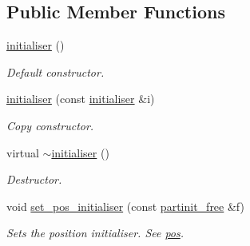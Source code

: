 \subsection*{Public Member Functions}
\begin{DoxyCompactItemize}
\item 
\mbox{\label{classphysim_1_1init_1_1initialiser_a6789bf24454c374ac607851d5888f96d}} 
\hyperlink{classphysim_1_1init_1_1initialiser_a6789bf24454c374ac607851d5888f96d}{initialiser} ()
\begin{DoxyCompactList}\small\item\em Default constructor. \end{DoxyCompactList}\item 
\mbox{\label{classphysim_1_1init_1_1initialiser_a9f34121f9325d86f1a3d80cf67646cf5}} 
\hyperlink{classphysim_1_1init_1_1initialiser_a9f34121f9325d86f1a3d80cf67646cf5}{initialiser} (const \hyperlink{classphysim_1_1init_1_1initialiser}{initialiser} \&i)
\begin{DoxyCompactList}\small\item\em Copy constructor. \end{DoxyCompactList}\item 
\mbox{\label{classphysim_1_1init_1_1initialiser_adbb5280ef62917b03bb0f4f2baf69019}} 
virtual \hyperlink{classphysim_1_1init_1_1initialiser_adbb5280ef62917b03bb0f4f2baf69019}{$\sim$initialiser} ()
\begin{DoxyCompactList}\small\item\em Destructor. \end{DoxyCompactList}\item 
\mbox{\label{classphysim_1_1init_1_1initialiser_ae2e6b7f36663b74b13746d671353e277}} 
void \hyperlink{classphysim_1_1init_1_1initialiser_ae2e6b7f36663b74b13746d671353e277}{set\+\_\+pos\+\_\+initialiser} (const \hyperlink{namespacephysim_1_1init_a075c918c300c8a7eb1e3449f8848be22}{partinit\+\_\+free} \&f)
\begin{DoxyCompactList}\small\item\em Sets the position initialiser. See \hyperlink{classphysim_1_1init_1_1initialiser_a1980105ffaa655858b90a8f3a9368682}{pos}. \end{DoxyCompactList}\item 

\end{DoxyCompactItemize}
